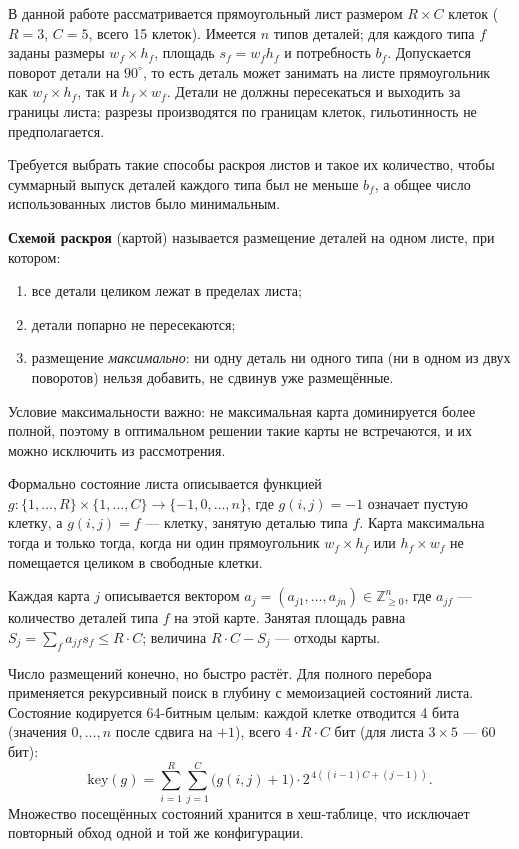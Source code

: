 В данной работе рассматривается прямоугольный лист размером $R \times C$
клеток ($R = 3$, $C = 5$, всего 15 клеток). Имеется $n$ типов деталей;
для каждого типа $f$ заданы размеры $w_f \times h_f$, площадь
$s_f = w_f h_f$ и потребность $b_f$. Допускается поворот детали на
$90^\circ$, то есть деталь может занимать на листе прямоугольник как
$w_f \times h_f$, так и $h_f \times w_f$. Детали не должны пересекаться
и выходить за границы листа; разрезы производятся по границам клеток,
гильотинность не предполагается.

Требуется выбрать такие способы раскроя листов и такое их количество,
чтобы суммарный выпуск деталей каждого типа был не меньше $b_f$, а
общее число использованных листов было минимальным.


\textbf{Схемой раскроя} (картой) называется размещение деталей на одном
листе, при котором:
\begin{enumerate}
    \item все детали целиком лежат в пределах листа;
    \item детали попарно не пересекаются;
    \item размещение \emph{максимально}: ни одну деталь ни одного типа
          (ни в одном из двух поворотов) нельзя добавить, не сдвинув
          уже размещённые.
\end{enumerate}

Условие максимальности важно: не максимальная карта доминируется более
полной, поэтому в оптимальном решении такие карты не встречаются, и их
можно исключить из рассмотрения.

Формально состояние листа описывается функцией
$g : \{1,\ldots,R\} \times \{1,\ldots,C\} \to \{-1,0,\ldots,n\}$,
где $g(i,j) = -1$ означает пустую клетку, а $g(i,j) = f$ — клетку,
занятую деталью типа $f$. Карта максимальна тогда и только тогда,
когда ни один прямоугольник $w_f \times h_f$ или $h_f \times w_f$ не
помещается целиком в свободные клетки.

Каждая карта $j$ описывается вектором
$a_j = (a_{j1}, \ldots, a_{jn}) \in \mathbb{Z}_{\ge 0}^n$, где
$a_{jf}$ — количество деталей типа $f$ на этой карте. Занятая площадь
равна $S_j = \sum_f a_{jf} s_f \le R \cdot C$; величина
$R \cdot C - S_j$ — отходы карты.


Число размещений конечно, но быстро растёт. Для полного перебора
применяется рекурсивный поиск в глубину с мемоизацией состояний листа.
Состояние кодируется 64-битным целым: каждой клетке отводится 4 бита
(значения $0,\ldots,n$ после сдвига на $+1$), всего $4 \cdot R \cdot C$
бит (для листа $3 \times 5$ — 60 бит):
\[
\mathrm{key}(g) = \sum_{i=1}^{R} \sum_{j=1}^{C}
\bigl(g(i,j) + 1\bigr) \cdot 2^{\,4((i-1)C + (j-1))}.
\]
Множество посещённых состояний хранится в хеш-таблице, что исключает
повторный обход одной и той же конфигурации.

